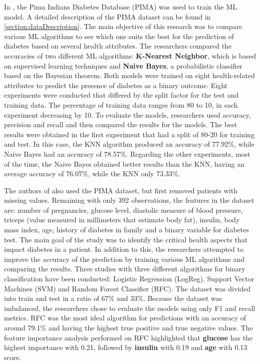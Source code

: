 \documentclass[runningheads]{llncs}
\begin{document}
In \cite{FEBRIAN202321}, the Pima Indians Diabetes Database (PIMA)  was used to train the ML model. A detailed description of the PIMA dataset can be found in \autoref{section:dataDescription}.
The main objective of this research was to compare various ML algorithms to see which one suits the best for the prediction of diabetes based on several health attributes. The researchers compared the accuracies of two different ML algorithms: \textbf{K-Nearest Neighbor}, which is based on supervised learning techniques and \textbf{Naive Bayes}, a probabilistic classifier based on the Bayesian theorem. 
Both models were trained on eight health-related attributes to predict the presence of diabetes as a binary outcome. Eight experiments were conducted that differed by the split factor for the test and training data. The percentage of training data ranges from 80 to 10, in each experiment decreasing by 10. 
To evaluate the models, researchers used accuracy, precision and recall and then compared the results for the models. The best results were obtained in the first experiment that had a split of 80-20 for training and test. In this case, the KNN algorithm produced an accuracy of 77.92\%, while Naive Bayes had an accuracy of 78.57\%. Regarding the other experiments, most of the time, the Naive Bayes obtained better results than the KNN, having an average accuracy of 76.07\%, while the KNN only 73.33\%.


The authors of \cite{Dutta} also used the PIMA dataset, but first removed patients with missing values. Remaining with only 392 observations, the features in the dataset are: number of pregnancies, glucose level, diastolic measure of blood pressure, triceps (value measured in millimeters that estimate body fat), insulin, body mass index, age, history of diabetes in family and a binary variable for diabetes test.
The main goal of the study was to identify the critical health aspects that impact diabetes in a patient. In addition to this, the researchers attempted to improve the accuracy of the prediction by training various ML algorithms and comparing the results.
Three studies with three different algorithms for binary classification have been conducted: Logistic Regression (LogReg), Support Vector Machines (SVM) and Random Forest Classifier (RFC). The dataset was divided into train and test in a ratio of 67\% and 33\%. 
Because the dataset was imbalanced, the researchers chose to evaluate the models using only F1 and recall metrics. RFC was the most ideal algorithm for predictions with an accuracy of around 79.1\% and having the highest true positive and true negative values. The feature importance analysis performed on RFC highlighted that \textbf{glucose} has the highest importance with 0.21, followed by \textbf{insulin} with 0.19 and \textbf{age} with 0.13 score.
\end{document}
